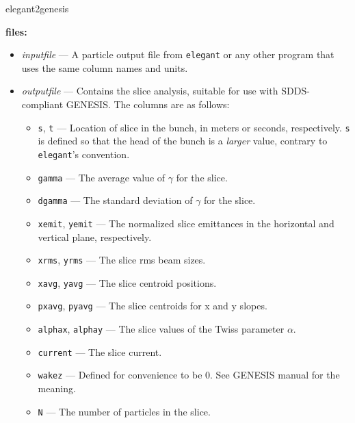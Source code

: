 \begin{sddsprog}{elegant2genesis}
  \item {\bf files:}
  \begin{itemize}
    \item {\em inputfile} --- A particle output file from \verb|elegant| or any other program that uses the same column names and units.
    \item {\em outputfile} --- Contains the slice analysis, suitable for use with SDDS-compliant GENESIS.  The columns are as follows:
      \begin{itemize}
        \item \verb|s|, \verb|t| --- Location of slice in the bunch, in meters or seconds, respectively. \verb|s| is defined so that the head of the bunch is a {\em larger} value, contrary to {\tt elegant}'s convention.
        \item \verb|gamma| --- The average value of $\gamma$ for the slice.
        \item \verb|dgamma| --- The standard deviation of $\gamma$ for the slice.
        \item \verb|xemit|, \verb|yemit| --- The normalized slice emittances in the horizontal and vertical plane, respectively.
        \item \verb|xrms|, \verb|yrms| --- The slice rms beam sizes.
        \item \verb|xavg|, \verb|yavg| --- The slice centroid positions.
        \item \verb|pxavg|, \verb|pyavg| --- The slice centroids for x and y slopes.
        \item \verb|alphax|, \verb|alphay| --- The slice values of the Twiss parameter $\alpha$.
        \item \verb|current| --- The slice current.
        \item \verb|wakez| --- Defined for convenience to be 0.  See GENESIS manual for the meaning.
        \item \verb|N| --- The number of particles in the slice.
      \end{itemize}
  \end{itemize}


\end{sddsprog}
